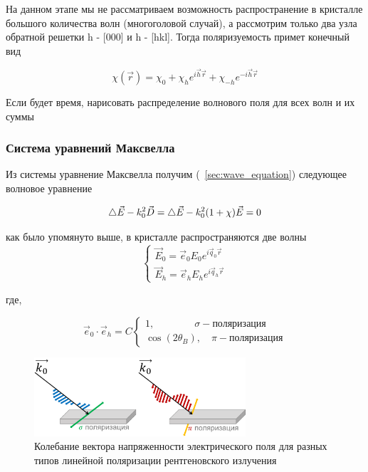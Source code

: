 На данном этапе мы не рассматриваем возможность распространение в кристалле большого количества
волн (многоголовой случай), а рассмотрим только два узла обратной решетки h - [000] и h - [hkl].
Тогда поляризуемость примет конечный вид

\begin{equation}
\chi(\vec{r}) = \chi_0 + \chi_h e^{i\vec{h}\vec{r}} + \chi_{-h} e^{-i\vec{h}\vec{r}}
 \end{equation}

\textcolor{mygreen}{Если будет время, нарисовать распределение волнового поля для всех волн и их суммы}

 \subsubsection{Система уравнений Максвелла}
 Из системы уравнение Максвелла получим (~\ref{sec:wave_equation}) следующее волновое уравнение

\begin{equation}
 \mathop{}\!\mathbin\bigtriangleup \vec{E} - k_0^2 \vec{D} = \mathop{}\!\mathbin\bigtriangleup \vec{E} - k_0^2 (1+\chi)\vec{E} = 0
\end{equation}

как было упомянуто выше, в кристалле распространяются две волны
\begin{equation}
 \begin{cases}
   \vec{E}_0 = \vec{e}_0 E_0 e^{i\vec{q}_0\vec{r}}
   \\
   \vec{E}_h = \vec{e}_h E_h e^{i\vec{q}_h\vec{r}}
 \end{cases}
\end{equation}

где,

\begin{equation}
\vec{e}_0 \cdot \vec{e}_h = C
 \begin{cases}
   1, \quad \quad \quad \quad  \sigma    - \text{поляризация}\\
   \cos(2\theta_B), \quad   \pi - \text{поляризация}
 \end{cases}
\end{equation}

\begin{figure}[H]
  \centering
  \includegraphics[width=0.7\textwidth]{images/polarize_E.png}
  \caption{ Колебание вектора напряженности электрического поля для разных типов линейной поляризации рентгеновского излучения}
  \label{ris:polarize_E}
\end{figure}
